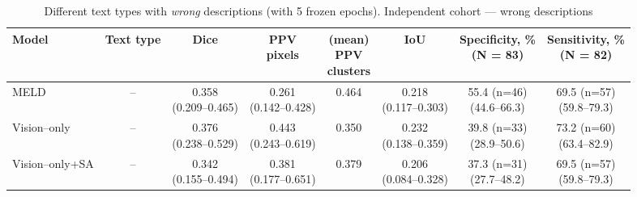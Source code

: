 \documentclass[FCD_GNN.tex]{subfiles}
\begin{document}
\begin{table}[H]
    \centering
    \tiny
    \caption{Different text types with \emph{wrong} descriptions (with 5 frozen epochs). Independent cohort — wrong descriptions}
    \label{tab:wrong_independent_cohort_mix_freeze}
    \begin{tabular}{lccccccc}
    \textbf{Model} &
    \textbf{Text type} &
    \textbf{Dice} &
    \makecell{\textbf{PPV}\\\textbf{pixels}} &
    \makecell{\textbf{(mean)}\\\textbf{PPV}\\\textbf{clusters}} &
    \textbf{IoU} &
    \makecell{\textbf{Specificity, \%} \\ (N = 83)}&
    \makecell{\textbf{Sensitivity, \%} \\ (N = 82)}\\
    \hline
    MELD & -- &
    \makecell{0.358\\(0.209--0.465)} &
    \makecell{0.261\\(0.142--0.428)} &
    0.464 &
    \makecell{0.218\\(0.117--0.303)} &
    \makecell{55.4 (n=46) \\ (44.6--66.3)} & 
    \makecell{69.5 (n=57) \\ (59.8--79.3)} \\
    \hline
    Vision--only & -- &
    \makecell{\colorbox{cyan!15}{0.376}\\(0.238--0.529)} &
    \makecell{\colorbox{cyan!15}{0.443}\\(0.243--0.619)} &
    0.350 &
    \makecell{\colorbox{cyan!15}{0.232}\\(0.138--0.359)} &
    \makecell{39.8 (n=33) \\ (28.9--50.6)} &
    \makecell{\colorbox{cyan!15}{73.2 (n=60)} \\ (63.4--82.9)} \\
    \hline
    Vision--only+SA & -- &
    \makecell{0.342\\ (0.155--0.494)} &
    \makecell{0.381\\ (0.177--0.651)} &
    0.379 &
    \makecell{0.206\\ (0.084--0.328)} &
    \makecell{37.3 (n=31) \\ (27.7--48.2)} &
    \makecell{69.5 (n=57) \\ (59.8--79.3)} \\

\end{tabular}
\end{table}
\end{document}
